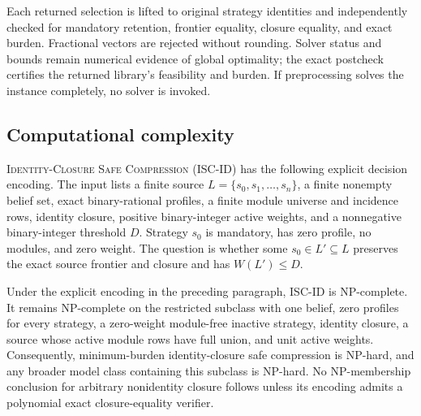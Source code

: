 Each returned selection is lifted to original strategy identities and independently
checked for mandatory retention, frontier equality, closure equality, and exact
burden. Fractional vectors are rejected without rounding. Solver status and
bounds remain numerical evidence of global optimality; the exact postcheck
certifies the returned library's feasibility and burden. If preprocessing
solves the instance completely, no solver is invoked.

\subsection{Computational complexity}
\label{subsec:aor-safe-compression-complexity}

\textsc{Identity-Closure Safe Compression} (\textsc{ISC-ID}) has the following
explicit decision encoding.  The input lists a finite source
\(L=\{s_0,s_1,\ldots,s_n\}\), a finite nonempty belief set, exact
binary-rational profiles, a finite module universe and incidence rows,
identity closure, positive binary-integer active weights, and a nonnegative
binary-integer threshold \(D\).  Strategy \(s_0\) is mandatory, has zero
profile, no modules, and zero weight.  The question is whether some
\(s_0\in L'\subseteq L\) preserves the exact source frontier and closure and
has \(W(L')\leq D\).

\begin{theorem}
\label{thm:aor-safe-compression-complexity}
Under the explicit encoding in the preceding paragraph,
\textnormal{\textsc{ISC-ID}} is NP-complete.  It remains NP-complete on the
restricted subclass with one belief, zero profiles for every strategy, a
zero-weight module-free inactive strategy, identity closure, a source whose
active module rows have full union, and unit active weights.  Consequently,
minimum-burden identity-closure safe compression is NP-hard, and any broader
model class containing this subclass is NP-hard.  No NP-membership conclusion
for arbitrary nonidentity closure follows unless its encoding admits a
polynomial exact closure-equality verifier.
\end{theorem}

